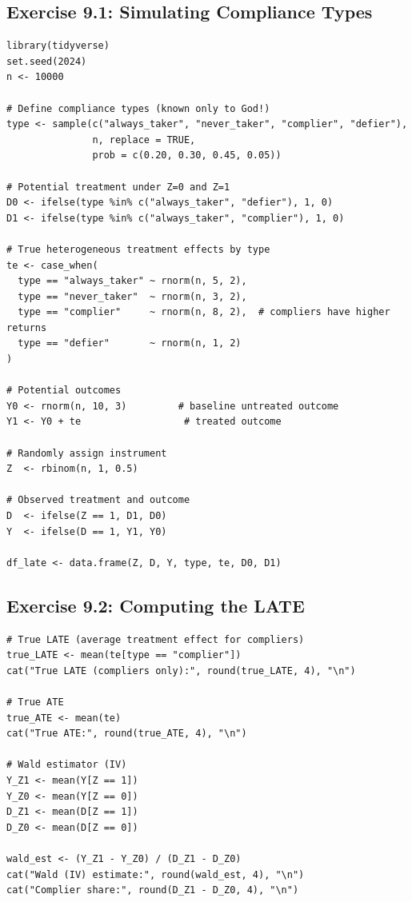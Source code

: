 \subsection{Exercise 9.1: Simulating Compliance Types}

\begin{lstlisting}
library(tidyverse)
set.seed(2024)
n <- 10000

# Define compliance types (known only to God!)
type <- sample(c("always_taker", "never_taker", "complier", "defier"),
               n, replace = TRUE,
               prob = c(0.20, 0.30, 0.45, 0.05))

# Potential treatment under Z=0 and Z=1
D0 <- ifelse(type %in% c("always_taker", "defier"), 1, 0)
D1 <- ifelse(type %in% c("always_taker", "complier"), 1, 0)

# True heterogeneous treatment effects by type
te <- case_when(
  type == "always_taker" ~ rnorm(n, 5, 2),
  type == "never_taker"  ~ rnorm(n, 3, 2),
  type == "complier"     ~ rnorm(n, 8, 2),  # compliers have higher returns
  type == "defier"       ~ rnorm(n, 1, 2)
)

# Potential outcomes
Y0 <- rnorm(n, 10, 3)         # baseline untreated outcome
Y1 <- Y0 + te                  # treated outcome

# Randomly assign instrument
Z  <- rbinom(n, 1, 0.5)

# Observed treatment and outcome
D  <- ifelse(Z == 1, D1, D0)
Y  <- ifelse(D == 1, Y1, Y0)

df_late <- data.frame(Z, D, Y, type, te, D0, D1)
\end{lstlisting}

\subsection{Exercise 9.2: Computing the LATE}

\begin{lstlisting}
# True LATE (average treatment effect for compliers)
true_LATE <- mean(te[type == "complier"])
cat("True LATE (compliers only):", round(true_LATE, 4), "\n")

# True ATE
true_ATE <- mean(te)
cat("True ATE:", round(true_ATE, 4), "\n")

# Wald estimator (IV)
Y_Z1 <- mean(Y[Z == 1])
Y_Z0 <- mean(Y[Z == 0])
D_Z1 <- mean(D[Z == 1])
D_Z0 <- mean(D[Z == 0])

wald_est <- (Y_Z1 - Y_Z0) / (D_Z1 - D_Z0)
cat("Wald (IV) estimate:", round(wald_est, 4), "\n")
cat("Complier share:", round(D_Z1 - D_Z0, 4), "\n")
\end{lstlisting}

